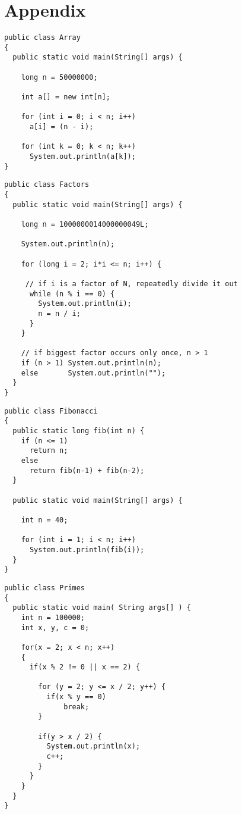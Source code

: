 \chapter{Appendix}

\lstset{
	language=Java,
	basicstyle=\small,
	stringstyle=\ttfamily
}

\begin{lstlisting}[frame=single, title= Array Benchmark]
public class Array
{	
  public static void main(String[] args) {
		
    long n = 50000000;
		
    int a[] = new int[n];
		
    for (int i = 0; i < n; i++)
      a[i] = (n - i);	
			
    for (int k = 0; k < n; k++)
      System.out.println(a[k]);
}
\end{lstlisting}

\begin{lstlisting}[frame=single, title= Factors Benchmark]
public class Factors
{
  public static void main(String[] args) { 

    long n = 1000000014000000049L;
        
    System.out.println(n);

    for (long i = 2; i*i <= n; i++) {

     // if i is a factor of N, repeatedly divide it out
      while (n % i == 0) {
        System.out.println(i); 
        n = n / i;
      }
    }

    // if biggest factor occurs only once, n > 1
    if (n > 1) System.out.println(n);
    else       System.out.println("");
  }
}
\end{lstlisting}

\begin{lstlisting}[frame=single, title= Fibonacci Benchmark]
public class Fibonacci
{
  public static long fib(int n) {
    if (n <= 1)
      return n;
    else
      return fib(n-1) + fib(n-2);
  }

  public static void main(String[] args) {
  
    int n = 40;
    
    for (int i = 1; i < n; i++)
      System.out.println(fib(i));
  }
}
\end{lstlisting}

\begin{lstlisting}[frame=single, title= Primes Benchmark]
public class Primes
{	
  public static void main( String args[] ) {
    int n = 100000;
    int x, y, c = 0;
    
    for(x = 2; x < n; x++)
    {   
      if(x % 2 != 0 || x == 2) {
      
        for (y = 2; y <= x / 2; y++) {
          if(x % y == 0)
              break;
        }
		
        if(y > x / 2) {
          System.out.println(x);
          c++;
        }
      }
    }
  } 
}
\end{lstlisting}
